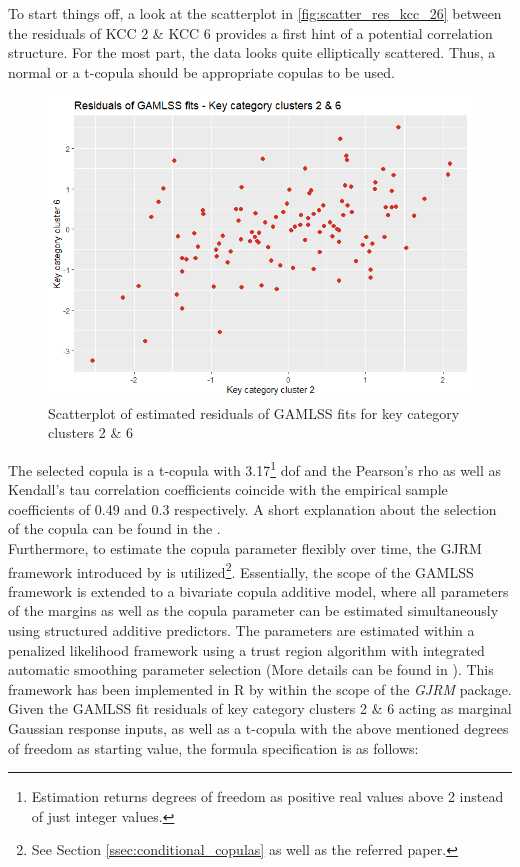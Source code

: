
To start things off, a look at the scatterplot in \autoref{fig:scatter_res_kcc_26} between the residuals of \ac{KCC} 2 \& \ac{KCC} 6 provides a first hint of a potential correlation structure. For the most part, the data looks quite elliptically scattered. Thus, a normal or a t-copula should be appropriate copulas to be used.
\\


\begin{figure}[H]
\centering
  \includegraphics[width=0.45\linewidth]{figures/scatter_res_kcc_26.png}
  \caption{Scatterplot of estimated residuals of GAMLSS fits for key category clusters 2 \& 6}
  \label{fig:scatter_res_kcc_26}
\end{figure}


The selected copula is a t-copula with 3.17\footnote{Estimation returns degrees of freedom as positive real values above 2 instead of just integer values.} \ac{dof} and the Pearson's rho as well as Kendall's tau correlation coefficients coincide with the empirical sample coefficients of 0.49 and 0.3 respectively. A short explanation about the selection of the copula can be found in the .
\\
Furthermore, to estimate the copula parameter flexibly over time, the \ac{GJRM} framework introduced by \cite{marra1605bivariate} is utilized\footnote{See Section \ref{ssec:conditional_copulas} as well as the referred paper.}. Essentially, the scope of the \ac{GAMLSS} framework is extended to a bivariate copula additive model, where all parameters of the margins as well as the copula parameter can be estimated simultaneously using structured additive predictors. The parameters are estimated within a penalized likelihood framework using a trust region algorithm with integrated automatic smoothing parameter selection (More details can be found in \cite{marra1605bivariate}). This framework has been implemented in R by \cite{marragjrm} within the scope of the \textit{GJRM} package. \\
Given the \ac{GAMLSS} fit residuals of key category clusters 2 \& 6 acting as marginal Gaussian response inputs, as well as a t-copula with the above mentioned degrees of freedom as starting value, the formula specification is as follows: \\



